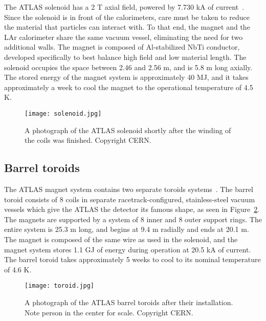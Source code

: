The ATLAS solenoid has a 2 T axial field, powered by 7.730 kA of current~\cite{ATLASPaper}. Since the solenoid is in front of the calorimeters, care must be taken to reduce the material that particles can interact with. To that end, the magnet and the LAr calorimeter share the same vacuum vessel, eliminating the need for two additional walls. The magnet is composed of Al-stabilized NbTi conductor, developed specifically to best balance high field and low material length. The solenoid occupies the space between 2.46 and 2.56 m, and is 5.8 m long axially. The stored energy of the magnet system is approximately 40 MJ, and it takes approximately a week to cool the magnet to the operational temperature of 4.5 K. 


\begin{figure}
\centering
\texttt{[image: solenoid.jpg]}
\label{fig:detector:solenoid}
\caption{A photograph of the ATLAS solenoid shortly after the winding of the coils was finished. Copyright CERN.}
\end{figure}



\subsection{Barrel toroids}

The ATLAS magnet system contains two separate toroids systems~\cite{ATLASPaper}. The barrel toroid consists of 8 coils in separate racetrack-configured, stainless-steel vacuum vessels which give the ATLAS the detector its famous shape, as seen in Figure~\ref{fig:detector:toroid}. The magnets are supported by a system of 8 inner and 8 outer support rings. The entire system is 25.3 m long, and begins at 9.4 m radially and ends at 20.1 m. The magnet is composed of the same wire as used in the solenoid, and the magnet system stores 1.1 GJ of energy during operation at 20.5 kA of current. The barrel toroid takes approximately 5 weeks to cool to its nominal temperature of 4.6 K.



\begin{figure}
\centering
\texttt{[image: toroid.jpg]}
\label{fig:detector:toroid}
\caption{A photograph of the ATLAS barrel toroids after their installation. Note person in the center for scale. Copyright CERN.}
\end{figure}

